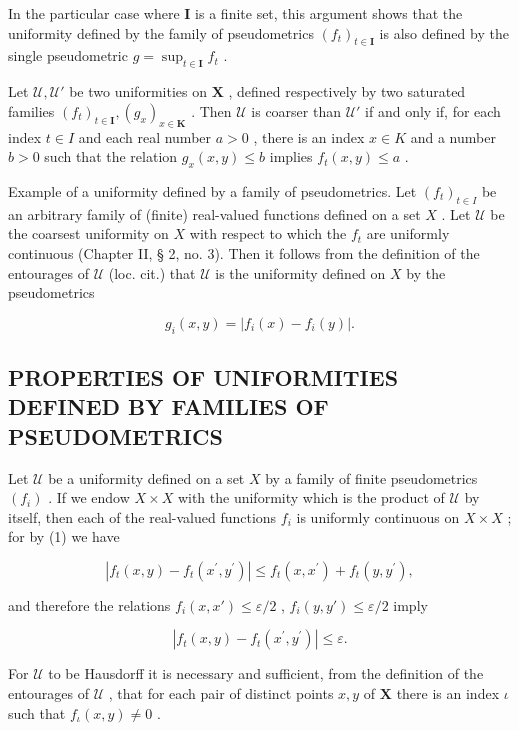 In the particular case where \(\mathbf{I}\) is a finite set, this argument shows that the uniformity defined by the family of pseudometrics \((f_{t})_{t\in \mathbf{I}}\) is also defined by the single pseudometric \(g = \sup_{t\in \mathbf{I}}f_t\) .

Let \(\mathcal{U},\mathcal{U}'\) be two uniformities on \(\mathbf{X}\) , defined respectively by two saturated families \((f_{t})_{t\in \mathbf{I}},(g_{x})_{x\in \mathbf{K}}\) . Then \(\mathcal{U}\) is coarser than \(\mathcal{U}'\) if and only if, for each index \(t\in I\) and each real number \(a > 0\) , there is an index \(x\in K\) and a number \(b > 0\) such that the relation \(g_{x}(x,y)\leqslant b\) implies \(f_{t}(x,y)\leqslant a\) .

Example of a uniformity defined by a family of pseudometrics. Let \((f_{t})_{t\in I}\) be an arbitrary family of (finite) real-valued functions defined on a set \(X\) . Let \(\mathcal{U}\) be the coarsest uniformity on \(X\) with respect to which the \(f_{t}\) are uniformly continuous (Chapter II, § 2, no. 3). Then it follows from the definition of the entourages of \(\mathcal{U}\) (loc. cit.) that \(\mathcal{U}\) is the uniformity defined on \(X\) by the pseudometrics

\[
g _ {i} (x, y) = | f _ {i} (x) - f _ {i} (y) |.
\]

\subsection{PROPERTIES OF UNIFORMITIES DEFINED BY FAMILIES OF PSEUDOMETRICS}

Let \(\mathcal{U}\) be a uniformity defined on a set \(X\) by a family of finite pseudometrics \((f_{i})\) . If we endow \(X \times X\) with the uniformity which is the product of \(\mathcal{U}\) by itself, then each of the real-valued functions \(f_{i}\) is uniformly continuous on \(X \times X\) ; for by (1) we have

\[
\left| f _ {t} (x, y) - f _ {t} \left(x ^ {\prime}, y ^ {\prime}\right) \right| \leqslant f _ {t} (x, x ^ {\prime}) + f _ {t} (y, y ^ {\prime}),
\]

and therefore the relations \(f_{i}(x, x') \leqslant \varepsilon / 2\) , \(f_{i}(y, y') \leqslant \varepsilon / 2\) imply

\[
\left| f _ {t} (x, y) - f _ {t} \left(x ^ {\prime}, y ^ {\prime}\right) \right| \leqslant \varepsilon .
\]

For \(\mathcal{U}\) to be Hausdorff it is necessary and sufficient, from the definition of the entourages of \(\mathcal{U}\) , that for each pair of distinct points \(x, y\) of \(\mathbf{X}\) there is an index \(\iota\) such that \(f_{\iota}(x, y) \neq 0\) .

